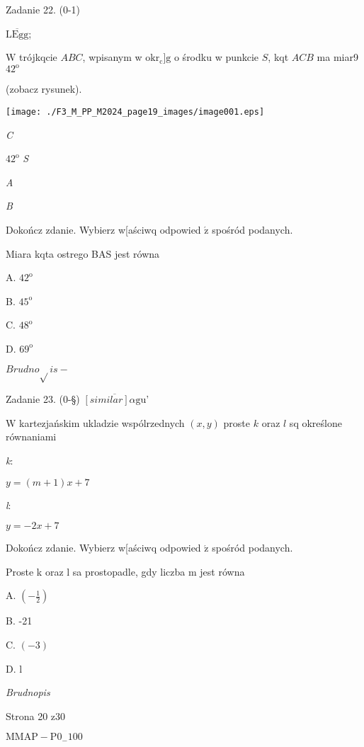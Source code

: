 \documentclass[a4paper,12pt]{article}
\begin{document}
Zadanie 22. (0-1)

$\overline{\mathrm{L}\mathrm{E}\mathrm{g}\mathrm{g}}$;

$\mathrm{W}$ trójkqcie $ABC$, wpisanym w $\mathrm{o}\mathrm{k}\mathrm{r}_{\mathrm{c}}$]$\mathrm{g}$ o środku w punkcie $S$, kqt $ACB$ ma miar9 $42^{\mathrm{o}}$

(zobacz rysunek).
\begin{center}
\texttt{[image: ./F3\_M\_PP\_M2024\_page19\_images/image001.eps]}
\end{center}
{\it C}

$42^{\mathrm{o}}$  {\it S}

{\it A}

{\it B}

Dokończ zdanie. Wybierz w[aściwq odpowied $\acute{\mathrm{z}}$ spośród podanych.

Miara kqta ostrego BAS jest równa

A. $42^{\mathrm{o}}$

B. $45^{\mathrm{o}}$

C. $48^{\mathrm{o}}$

D. $69^{\mathrm{o}}$

$Brudno\sqrt{}is -$

Zadanie 23. (0-\S) $\overline{[similar]\alpha \mathrm{g}\mathrm{u}}$'

$\mathrm{W}$ kartezjańskim ukladzie wspólrzednych $(x,y)$ proste $k$ oraz $l$ sq określone równaniami

{\it k}:

$y=(m+1)x+7$

{\it l}:

$y=-2x+7$

Dokończ zdanie. Wybierz w[aściwq odpowied $\acute{\mathrm{z}}$ spośród podanych.

Proste k oraz l sa prostopadle, gdy liczba m jest równa

A. $(-\displaystyle \frac{1}{2})$

B. -21

C. $(-3)$

D. l

{\it Brudnopis}

Strona 20 z30

$\mathrm{M}\mathrm{M}\mathrm{A}\mathrm{P}-\mathrm{P}0_{-}100$
\end{document}
